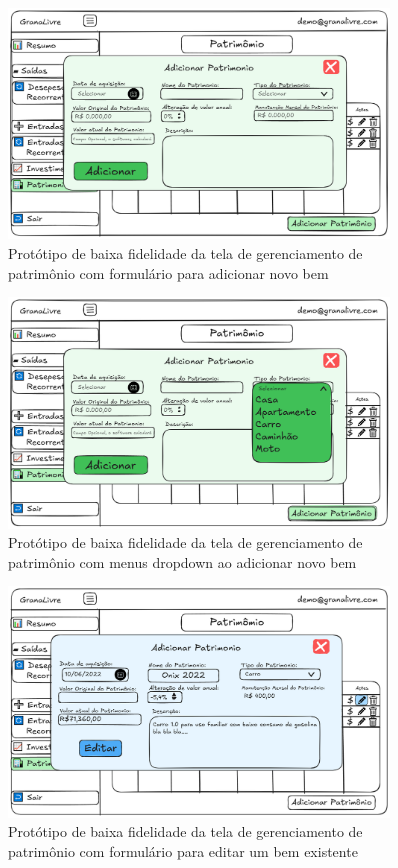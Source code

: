 \begin{figure}[H]
    \centering
    \includegraphics[width=0.9\textwidth]{imgs/09-patrimonio2.png}
    \caption{Protótipo de baixa fidelidade da tela de gerenciamento de patrimônio com formulário para adicionar novo bem}
    \label{fig:prot_patrimonio2}
\end{figure}

\begin{figure}[H]
    \centering
    \includegraphics[width=0.9\textwidth]{imgs/09-patrimonio3.png}
    \caption{Protótipo de baixa fidelidade da tela de gerenciamento de patrimônio com menus dropdown ao adicionar novo bem}
    \label{fig:prot_patrimonio3}
\end{figure}

\begin{figure}[H]
    \centering
    \includegraphics[width=0.9\textwidth]{imgs/09-patrimonio4.png}
    \caption{Protótipo de baixa fidelidade da tela de gerenciamento de patrimônio com formulário para editar um bem existente}
    \label{fig:prot_patrimonio4}
\end{figure}

